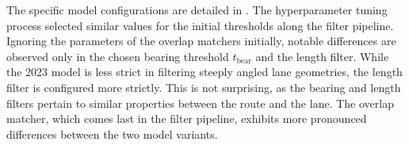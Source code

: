 \begin{table}[t]
\caption{Tuned hyperparameters for the algorithmic matching model. The parameter identifiers were explained further in .}
\label{tab:hyperparameter-tuning-results}
\end{table}

The specific model configurations are detailed in . The hyperparameter tuning process selected similar values for the initial thresholds along the filter pipeline. Ignoring the parameters of the overlap matchers initially, notable differences are observed only in the chosen bearing threshold $t_{\text{bear}}$ and the length filter. While the 2023 model is less strict in filtering steeply angled lane geometries, the length filter is configured more strictly. This is not surprising, as the bearing and length filters pertain to similar properties between the route and the lane. The overlap matcher, which comes last in the filter pipeline, exhibits more pronounced differences between the two model variants. 

